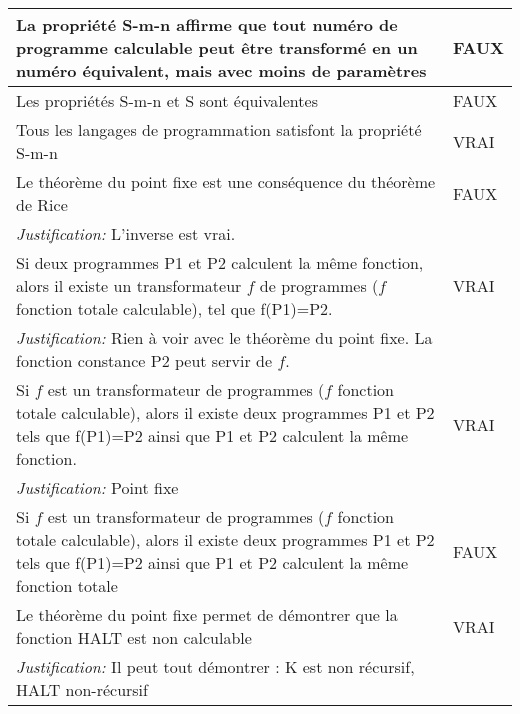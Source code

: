 \begin{tabular}{p{13cm}|l}
    La propriété S-m-n affirme que tout numéro de programme calculable peut être transformé en un numéro équivalent, mais avec moins de paramètres & FAUX \\
     \hline
    
    Les propriétés S-m-n et S sont équivalentes & FAUX \\
     \hline
    
    Tous les langages de programmation satisfont la propriété S-m-n & VRAI \\
     \hline
     
     Le théorème du point fixe est une conséquence du théorème de Rice & FAUX\\
     \textit{Justification:} L'inverse est vrai. & \\
     \hline
     Si deux programmes P1 et P2 calculent la même fonction, alors il existe un transformateur $f$ de programmes ($f$ fonction totale calculable), tel que f(P1)=P2. & VRAI \\
     \textit{Justification:} Rien à voir avec le théorème du point fixe. La fonction constance P2 peut servir de $f$. & \\
     \hline
     
     Si $f$ est un transformateur de programmes ($f$ fonction totale calculable), alors il existe deux programmes P1 et P2 tels que f(P1)=P2 ainsi que P1 et P2 calculent la même fonction. & VRAI \\
     \textit{Justification:} Point fixe & \\
     \hline
     
     Si $f$ est un transformateur de programmes ($f$ fonction totale calculable), alors il existe deux programmes P1 et P2 tels que f(P1)=P2 ainsi que P1 et P2 calculent la même fonction totale & FAUX \\
     \hline
     
     Le théorème du point fixe permet de démontrer que la fonction HALT est non calculable & VRAI \\
     \textit{Justification:} Il peut tout démontrer : K est non récursif, HALT non-récursif & \\
     \hline
     

\end{tabular}
